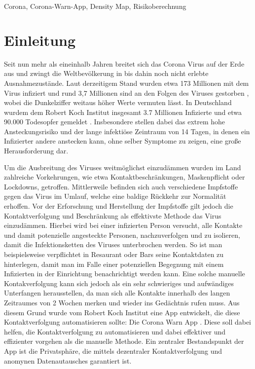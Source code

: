 \documentclass[conference,compsoc]{IEEEtran}
\begin{document}
\begin{IEEEkeywords}
Corona, Corona-Warn-App, Density Map, Risikoberechnung
\end{IEEEkeywords}

\section{Einleitung} \label{Einleitung}
Seit nun mehr als eineinhalb Jahren breitet sich das Corona Virus auf der Erde aus und zwingt die Weltbevölkerung in bis dahin noch nicht erlebte Ausnahmezustände.
Laut derzeitigem Stand wurden etwa 173 Millionen mit dem Virus infiziert und rund 3,7 Millionen sind an den Folgen des Viruses gestorben \cite{CoronaZahlenWorld}, wobei die Dunkelziffer weitaus höher Werte vermuten lässt. 
In Deutschland wurdem dem Robert Koch Institut insgesamt 3.7 Millionen Infizierte und etwa 90.000 Todesopfer gemeldet \cite{CoronaZahlenDe}. 
Insbesondere stellen dabei das extrem hohe Ansteckungsrisiko und der lange infektiöse Zeintraum von 14 Tagen, in denen ein Infizierter andere anstecken kann, ohne selber Symptome zu zeigen, eine große Herausforderung dar.

Um die Ausbreitung des Viruses weitmöglichst einzudämmen wurden im Land zahlreiche Vorkehrungen, wie etwa Kontaktbeschränkungen, Maskenpflicht oder Lockdowns, getroffen. 
Mittlerweile befinden sich auch verschiedene Impfstoffe gegen das Virus im Umlauf, welche eine baldige Rückkehr zur Normalität erhoffen.
Vor der Erforschung und Herstellung der Impfstoffe gilt jedoch die Kontaktverfolgung und Beschränkung als effektivste Methode das Virus einzudämmen. 
Hierbei wird bei einer infizierten Person versucht, alle Kontakte und damit potenzielle angesteckte Personen, nachzuverfolgen und zu isolieren, damit die Infektionsketten des Viruses unterbrochen werden.
So ist man beispielsweise verpflichtet in Resaurant oder Bars seine Kontaktdaten zu hinterlegen, damit man im Falle einer potenziellen Begegnung mit einem Infizierten in der Einrichtung benachrichtigt werden kann.
Eine solche manuelle Kontakverfolgung kann sich jedoch als ein sehr schwieriges und aufwändiges Unterfangen herausstellen, da man sich alle Kontakte innerhalb des langen Zeitraumes von 2 Wochen merken und wieder ins Gedächtnis rufen muss.
Aus diesem Grund wurde vom Robert Koch Institut eine App entwickelt, die diese Kontaktverfolgung automatisieren sollte: Die Corona Warn App \cite{CWA}. 
Diese soll dabei helfen, die Kontaktverfolgung zu automatisieren und dabei effektiver und effizienter vorgehen als die manuelle Methode.
Ein zentraler Bestandspunkt der App ist die Privatsphäre, die mittels dezentraler Kontaktverfolgung und anomynen Datenautausches garantiert ist.
\end{document}
